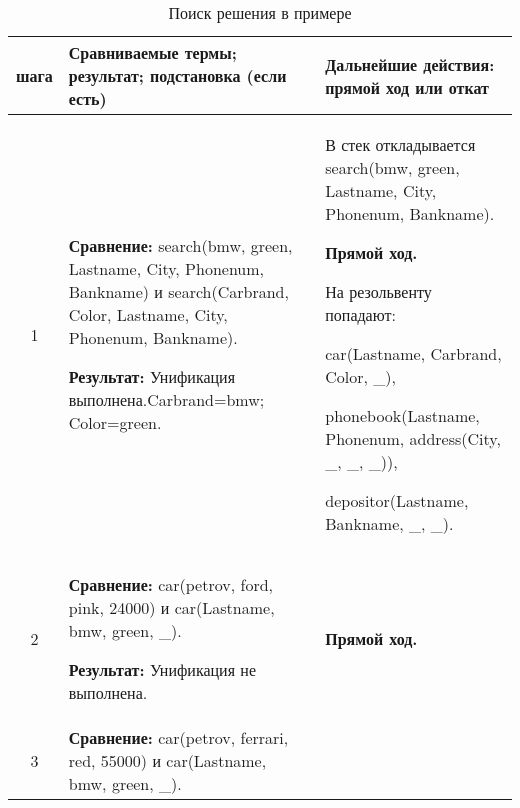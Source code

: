 \footnotesize
\begin{longtable}{|c|p{}|p{}|}
    \caption{Поиск решения в примере }\label{tbl:ex2} \\
    \hline
    \textnumero{} шага & Сравниваемые термы; результат; подстановка (если есть)  & Дальнейшие действия: прямой ход или откат \\
    \hline

    1
                       &
\textbf{Сравнение:} \newline
  search(bmw, green, Lastname, City, Phonenum, Bankname)
    \newline и \newline
    search(Carbrand, Color, Lastname, City, Phonenum, Bankname).
    \newline

    \textbf{Результат:} \newline
    Унификация выполнена.\newline{}Carbrand=bmw; Color=green.
                       &
    В стек откладывается\newline
  search(bmw, green, Lastname, City, Phonenum, Bankname).
    \newline

    \textbf{Прямой ход.}

    На резольвенту попадают:

    car(Lastname, Carbrand, Color, \_),

    phonebook(Lastname, Phonenum, address(City, \_, \_, \_)),

    depositor(Lastname, Bankname, \_, \_).
                       \\ \hline

    2
                       &
    \textbf{Сравнение:} \newline
  car(petrov, ford,    pink,   24000)
    \newline и \newline
    car(Lastname, bmw, green, \_).
    \newline

    \textbf{Результат:} \newline
    Унификация не выполнена.
                       &
    \textbf{Прямой ход.}
                       \\ \hline

    3
                       &
    \textbf{Сравнение:} \newline
  car(petrov, ferrari, red,    55000)
    \newline и \newline
    car(Lastname, bmw, green, \_).
    \newline


\end{longtable}
